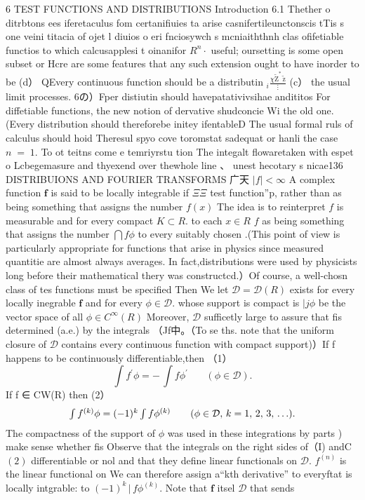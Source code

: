 6 TEST FUNCTIONS AND DISTRIBUTIONS Introduction 6.1 Thether o ditrbtons ees iferetaculus fom certanifiuies ta arise casnifertileunctonscis tTis s one veini titacia of ojet l diuios o eri fnciosywch s mcniaiththnh clas ofifetiable functios to which calcusapplesi t oinanifor $\textstyle R^{n}\!\cdot$ useful; oursetting is some open subset or Hcre are some features that any such extension ought to have inorder to be (d） QEvery continuous function should be a distributin $_{i}\frac{\chi\tilde{\mathrm{Z}}^{*}\,\tilde{\mathrm{z}}}{\vdots}$ (c） the usual limit processes. 6の）Fper distiutin should havepatativivsihae andititos For diffetiable functions, the new notion of dervative shudconcie Wi the old one.(Every distribution should thereforebe initey ifentableD The usual formal ruls of calculus should hoid Theresul spyo cove toromstat sadequat or hanli the case $\scriptstyle n\;=\;1.$ To ot teitns come e temriyrstu tion The integalt flowaretaken with espet o Lcbegemasure and thyexend over thewhole line 、 unest hecotary s nicae136 DISTRIBUIONS AND FOURIER TRANSFORMS 广天 $|f|<\infty$ A complex function $\boldsymbol{f}$ is said to be locally integrable if $\Xi\Xi$ test function”p, rather than as being something that assigns the number $f(x)$ The idea is to reinterpret $\boldsymbol{\mathit{f}}$ is measurable and for every compact $K\subset R.$ to each $x\in R$ $\boldsymbol{\mathit{f}}$ as being something that assigns the number $\textstyle\bigcap{f\phi}$ to every suitably chosen .(This point of view is particularly appropriate for functions that arise in physics since measured quantitie are almost always averages. In fact,distributions were used by physicists long before their mathematical thery was constructcd.）Of course, a well-chosn class of tes functions must be specified Then We let ${\mathcal{D}}={\mathcal{D}}(R)$ exists for every locally inegrable $\boldsymbol{f}$ and for every $\phi\in{\mathcal{D}}.$ whose support is compact is $\vert{j\phi}$ be the vector space of all $\phi\in C^{\infty}(R)$ Moreover, ${\mathcal{D}}$ sufficetly large to assure that fis determined (a.e.) by the integrals （Jf中。（To se ths. note that the uniform closure of ${\mathcal{D}}$ contains every continuous function with compact support)）If f happens to be continuously differentiable,then （1） $$ \textstyle\int\!f^{\prime}\phi=-\,\int\!f\phi^{\prime}\,\,\,\,\,\,\,\,\,\,\,(\phi\in\mathcal{D}). $$ If f ∈ CW(R) then (2） $$ \begin{array}{c c c}{{\int f^{(k)}\phi=(-1)^{k}\int f\phi^{(k)}\qquad(\phi\in\mathcal{D},\,k=1,\,2,\,3,\,\ldots).}}\end{array} $$ The compactness of the support of $\phi$ was used in these integrations by parts ) make sense whether fis Observe that the integrals on the right sides of（I) andC $(2)$ differentiable or nol and that they define linear functionals on ${\mathcal{D}}.$ $f^{(n)}$ is the linear functional on We can therefore assign a“kth derivative” to everyftat is locally intgrable: to $(-1)^{k}\,\vert\,f\phi^{(k)}.$ Note that $\boldsymbol{f}$ itsel ${\mathcal{D}}$ that sends 